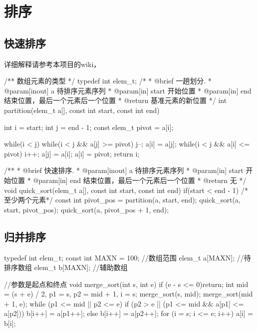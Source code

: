 \chapter{排序}

\section{快速排序} %
详细解释请参考本项目的wiki，

\begin{Codex}[label=quick_sort.c]
/** 数组元素的类型 */
typedef int elem_t;
 /*
  * @brief 一趟划分.
  * @param[inout] a 待排序元素序列
  * @param[in] start 开始位置
  * @param[in] end 结束位置，最后一个元素后一个位置
  * @return 基准元素的新位置
  */
int partition(elem_t a[], const int start, const int end) {
    int i = start;
    int j = end - 1;
    const elem_t pivot = a[i];

    while(i < j) {
        while(i < j && a[j] >= pivot) j--;
        a[i] = a[j];
        while(i < j && a[i] <= pivot) i++;
        a[j] = a[i];
    }
    a[i] = pivot;
    return i;
}

/**
  * @brief 快速排序.
  * @param[inout] a 待排序元素序列
  * @param[in] start 开始位置
  * @param[in] end 结束位置，最后一个元素后一个位置
  * @return 无
  */
void quick_sort(elem_t a[], const int start, const int end) {
    if(start < end - 1) { /* 至少两个元素*/
        const int pivot_pos = partition(a, start, end);
        quick_sort(a, start, pivot_pos);
        quick_sort(a, pivot_pos + 1, end);
    }
}
\end{Codex}

\section{归并排序} %

\begin{Codex}[label=quick_sort.c]
typedef int elem_t;
const int MAXN = 100; //数组范围
elem_t a[MAXN];       //待排序数组
elem_t b[MAXN];       //辅助数组

//参数是起点和终点
void merge_sort(int s, int e)
{
    if (e - s <= 0)return;
    int mid = (s + e) / 2, p1 = s, p2 = mid + 1, i = s;
    merge_sort(s, mid);
    merge_sort(mid + 1, e);
    while (p1 <= mid || p2 <= e)
    {
        if (p2 > e || (p1 <= mid && a[p1] <= a[p2]))
            b[i++] = a[p1++];
        else b[i++] = a[p2++];
    }
    for (i = s; i <= e; i++)
        a[i] = b[i];
}
\end{Codex}